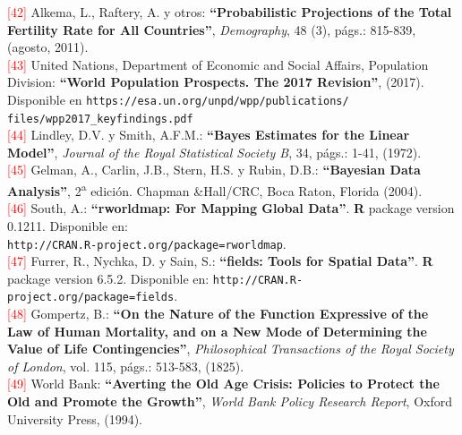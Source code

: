 \noindent \textcolor{red}{[42]} Alkema, L., Raftery, A. y otros: \textbf{``Probabilistic Projections of the Total Fertility Rate for All Countries''}, \textit{Demography}, 48 (3), págs.: 815-839, (agosto, 2011).\\ 

\noindent \textcolor{red}{[43]} United Nations, Department of Economic and Social Affairs, Population Division: \textbf{``World Population Prospects. The 2017 Revision''}, (2017). Disponible en {\texttt{\small{https://esa.un.org/unpd/wpp/publications/\\
files/wpp2017\_keyfindings.pdf}}}\\

\noindent \textcolor{red}{[44]} Lindley, D.V. y Smith, A.F.M.: \textbf{``Bayes Estimates for the Linear Model''}, \textit{Journal of the Royal Statistical Society B}, 34, págs.: 1-41, (1972).\\ 

\noindent \textcolor{red}{[45]} Gelman, A., Carlin, J.B., Stern, H.S. y Rubin, D.B.: \textbf{``Bayesian Data Analysis''}, 2\textsuperscript{a} edición. Chapman \&Hall/CRC, Boca Raton, Florida (2004).\\ 

\noindent \textcolor{red}{[46]} South, A.: \textbf{``rworldmap: For Mapping Global Data''}. \textsf{\textbf{R}} package version 0.1211. Disponible en:\\
{\texttt{\small{http://CRAN.R-project.org/package=rworldmap}}}.\\ 

\noindent \textcolor{red}{[47]} Furrer, R., Nychka, D. y Sain, S.: \textbf{``fields: Tools for Spatial Data''}. \textsf{\textbf{R}} package version 6.5.2. Disponible en: {\texttt{\small{http://CRAN.R-project.org/package=fields}}}.\\ 

\noindent \textcolor{red}{[48]} Gompertz, B.: \textbf{``On the Nature of the Function Expressive of the Law of Human Mortality, and on a New Mode of Determining the Value of Life Contingencies''}, \textit{Philosophical Transactions of the Royal Society of London}, vol. 115, págs.: 513-583, (1825).\\

\noindent \textcolor{red}{[49]} World Bank: \textbf{``Averting the Old Age Crisis: Policies to Protect the Old and Promote the Growth''}, \textit{World Bank Policy Research Report}, Oxford University Press, (1994).\\

